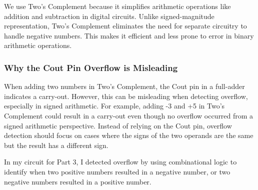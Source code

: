 \documentclass[12pt]{article}
\begin{document}
We use Two’s Complement because it simplifies arithmetic operations like addition and subtraction in digital circuits. Unlike signed-magnitude representation, Two’s Complement eliminates the need for separate circuitry to handle negative numbers. This makes it efficient and less prone to error in binary arithmetic operations.
\subsubsection*{Why the Cout Pin Overflow is Misleading}
When adding two numbers in Two’s Complement, the Cout pin in a full-adder indicates a carry-out. However, this can be misleading when detecting overflow, especially in signed arithmetic. For example, adding -3 and +5 in Two’s Complement could result in a carry-out even though no overflow occurred from a signed arithmetic perspective. Instead of relying on the Cout pin, overflow detection should focus on cases where the signs of the two operands are the same but the result has a different sign.

In my circuit for Part 3, I detected overflow by using combinational logic to identify when two positive numbers resulted in a negative number, or two negative numbers resulted in a positive number.
\end{document}

